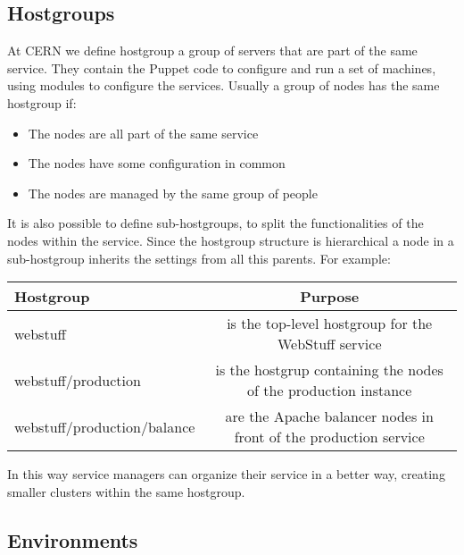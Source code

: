 
\subsection{Hostgroups}

At CERN we define hostgroup a group of servers that are part of the same
service. They contain the Puppet code to configure and run a set of
machines, using modules to configure the services. Usually a group of
nodes has the same hostgroup if:

\begin{itemize}

\item The nodes are all part of the same service

\item The nodes have some configuration in common

\item The nodes are managed by the same group of people

\end{itemize}

It is also possible to define sub-hostgroups, to split the functionalities
of the nodes within the service. Since the hostgroup structure is
hierarchical a node in a sub-hostgroup inherits the settings from all this
parents. For example: 

\begin{table}[H]
    \begin{center}
    \begin{tabular}{|l|c|}
        \hline
        \textbf{Hostgroup} & \textbf{Purpose} \\
        \hline
        webstuff & is the top-level hostgroup for the WebStuff service \\
        \hline
        webstuff/production & is the hostgrup containing the nodes of the production instance \\
        \hline
        webstuff/production/balance & are the Apache balancer nodes in front of the production service \\
        \hline
    \end{tabular}
    \end{center}
\end{table}

In this way service managers can organize their service in a better way,
creating smaller clusters within the same hostgroup.

\subsection{Environments}

